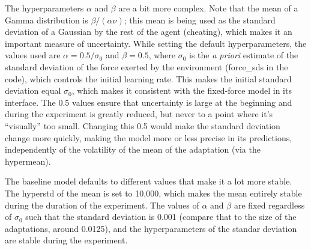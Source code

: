 \documentclass[a4paper,doc,floatsintext,natbib]{apa6}
\begin{document}
The hyperparameters $\alpha$ and $\beta$ are a bit more complex. Note that the
mean of a Gamma distribution is $\beta / (\alpha \nu)$; this mean is being used
as the standard deviation of a Gaussian by the rest of the agent (cheating),
which makes it an important measure of uncertainty. While setting the default
hyperparameters, the values used are $\alpha = 0.5 / \sigma_0$ and
$\beta = 0.5$, where $\sigma_0$ is the \textit{a priori} estimate of the
standard deviation of the force exerted by the environment (force\_sds in the
code), which controls the initial learning rate. This makes the initial
standard deviation equal $\sigma_0$, which makes it consistent with the
fixed-force model in its interface. The 0.5 values ensure that uncertainty is
large at the beginning and during the experiment is greatly reduced, but never
to a point where it's ``visually'' too small. Changing this 0.5 would make the
standard deviation change more quickly, making the model more or less precise
in its predictions, independently of the volatility of the mean of the
adaptation (via the hypermean).

The baseline model defaults to different values that make it a lot more
stable. The hyperstd of the mean is set to 10,000, which makes the mean
entirely stable during the duration of the experiment. The values of $\alpha$
and $\beta$ are fixed regardless of $\sigma_0$ such that the standard deviation
is 0.001 (compare that to the size of the adaptations, around 0.0125), and the
hyperparameters of the standar deviation are stable during the experiment.




\end{document}
